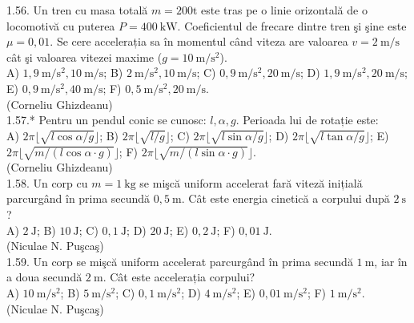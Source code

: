 1.56. Un tren cu masa totală $m=200 \mathrm{t}$ este tras pe o linie orizontală de o locomotivă cu puterea $P=400 \mathrm{~kW}$. Coeficientul de frecare dintre tren şi şine este $\mu=0,01$. Se cere accelerația sa în momentul când viteza are valoarea $v=2 \mathrm{~m} / \mathrm{s}$ cât şi valoarea vitezei maxime ($g=10 \mathrm{~m} / \mathrm{s}^{2}$).\\ A) $1,9 \mathrm{~m} / \mathrm{s}^{2}, 10 \mathrm{~m} / \mathrm{s}$; B) $2 \mathrm{~m} / \mathrm{s}^{2}, 10 \mathrm{~m} / \mathrm{s}$; C) $0,9 \mathrm{~m} / \mathrm{s}^{2}, 20 \mathrm{~m} / \mathrm{s}$; D) $1,9 \mathrm{~m} / \mathrm{s}^{2}, 20 \mathrm{~m} / \mathrm{s}$; E) $0,9 \mathrm{~m} / \mathrm{s}^{2}, 40 \mathrm{~m} / \mathrm{s}$; F) $0,5 \mathrm{~m} / \mathrm{s}^{2}, 20 \mathrm{~m} / \mathrm{s}$.\\ (Corneliu Ghizdeanu)\\

1.57.* Pentru un pendul conic se cunosc: $l, \alpha, g$. Perioada lui de rotație este:\\ A) $2\pi \lfloor \sqrt{l \cos \alpha / g} \rfloor$; B) $2\pi \lfloor \sqrt{l / g} \rfloor$; C) $2\pi \lfloor \sqrt{l \sin \alpha / g} \rfloor$; D) $2\pi \lfloor \sqrt{l \tan \alpha / g} \rfloor$; E) $2\pi \lfloor \sqrt{m / (l \cos \alpha \cdot g)} \rfloor$; F) $2\pi \lfloor \sqrt{m / (l \sin \alpha \cdot g)} \rfloor$.\\ (Corneliu Ghizdeanu)\\

1.58. Un corp cu $m=1 \mathrm{~kg}$ se mişcă uniform accelerat fară viteză inițială parcurgând în prima secundă $0,5 \mathrm{~m}$. Cât este energia cinetică a corpului după $2 \mathrm{~s}$?\\ A) $2 \mathrm{~J}$; B) $10 \mathrm{~J}$; C) $0,1 \mathrm{~J}$; D) $20 \mathrm{~J}$; E) $0,2 \mathrm{~J}$; F) $0,01 \mathrm{~J}$.\\ (Niculae N. Puşcaş)\\

1.59. Un corp se mişcă uniform accelerat parcurgând în prima secundă $1 \mathrm{~m}$, iar în a doua secundă $2 \mathrm{~m}$. Cât este accelerația corpului?\\ A) $10 \mathrm{~m} / \mathrm{s}^{2}$; B) $5 \mathrm{~m} / \mathrm{s}^{2}$; C) $0,1 \mathrm{~m} / \mathrm{s}^{2}$; D) $4 \mathrm{~m} / \mathrm{s}^{2}$; E) $0,01 \mathrm{~m} / \mathrm{s}^{2}$; F) $1 \mathrm{~m} / \mathrm{s}^{2}$.\\ (Niculae N. Puşcaş)\\

